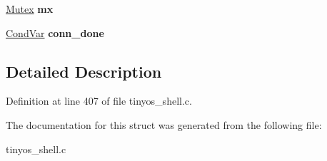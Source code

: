 \begin{DoxyCompactItemize}
\item 
\hyperlink{group__syscalls_gaef2ec62cae8e0031fd19fc8b91083ade}{Mutex} {\bfseries mx}\hypertarget{struct____rs__globals_ae6f58855b0c5911cacb493a1f305c9e3}{}\label{struct____rs__globals_ae6f58855b0c5911cacb493a1f305c9e3}

\item 
\hyperlink{structCondVar}{Cond\+Var} {\bfseries conn\+\_\+done}\hypertarget{struct____rs__globals_acded897204308c539cab184093cd6207}{}\label{struct____rs__globals_acded897204308c539cab184093cd6207}

\end{DoxyCompactItemize}


\subsection{Detailed Description}


Definition at line 407 of file tinyos\+\_\+shell.\+c.



The documentation for this struct was generated from the following file\+:\begin{DoxyCompactItemize}
\item 
tinyos\+\_\+shell.\+c\end{DoxyCompactItemize}
